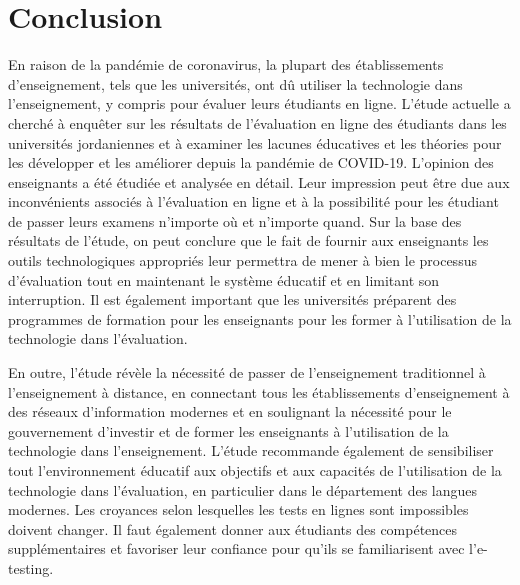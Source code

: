 \documentclass[french]{textolivre}
\begin{document}
\section{Conclusion}

En raison de la pandémie de coronavirus, la plupart des établissements d'enseignement, tels que les universités, ont dû utiliser la technologie dans l'enseignement, y compris pour évaluer leurs étudiants en ligne. L'étude actuelle a cherché à enquêter sur les résultats de l'évaluation en ligne des étudiants dans les universités jordaniennes et à examiner les lacunes éducatives et les théories pour les développer et les améliorer depuis la pandémie de COVID-19. L'opinion des enseignants a été étudiée et analysée en détail. Leur impression peut être due aux inconvénients associés à l'évaluation en ligne et à la possibilité pour les étudiant de passer leurs examens n'importe où et n'importe quand. Sur la base des résultats de l'étude, on peut conclure que le fait de fournir aux enseignants les outils technologiques appropriés leur permettra de mener à bien le processus d'évaluation tout en maintenant le système éducatif et en limitant son interruption. Il est également important que les universités préparent des programmes de formation pour les enseignants pour les former à l'utilisation de la technologie dans l'évaluation.

En outre, l'étude révèle la nécessité de passer de l'enseignement traditionnel à l'enseignement à distance, en connectant tous les établissements d'enseignement à des réseaux d'information modernes et en soulignant la nécessité pour le gouvernement d’investir et de former les enseignants à l'utilisation de la technologie dans l'enseignement. L'étude recommande également de sensibiliser tout l'environnement éducatif aux objectifs et aux capacités de l'utilisation de la technologie dans l'évaluation, en particulier dans le département des langues modernes. Les croyances selon lesquelles les tests en lignes sont impossibles doivent changer. Il faut également donner aux étudiants des compétences supplémentaires et favoriser leur confiance pour qu’ils se familiarisent avec l'e-testing.


\printbibliography\label{sec-bib}
\end{document}
